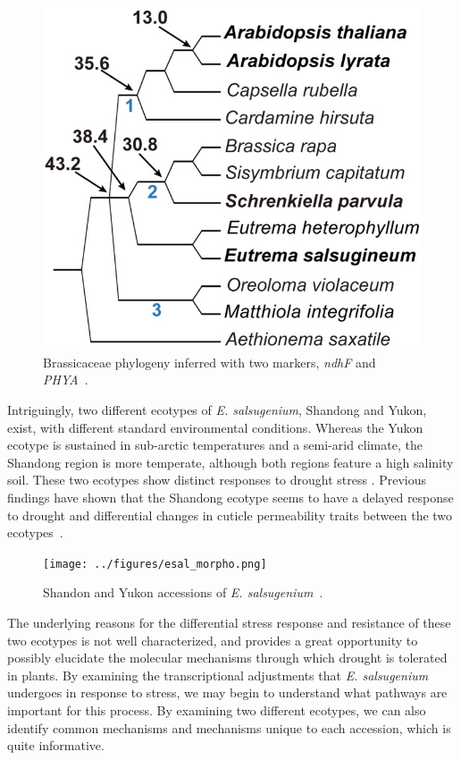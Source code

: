 \documentclass[12pt]{article}
\newcommand{\esal}{\textit{E. salsugenium}}
\begin{document}
		\begin{figure}[H]
			\centering
			\includegraphics[scale=2]{../figures/esal_phylo.jpg}
			\caption[Brassicaceae Phylogeny]{Brassicaceae phylogeny inferred with two markers, \textit{ndhF} and \textit{PHYA}~\cite{yang2013reference}.}
			\label{phylo}
		\end{figure}
		
	Intriguingly, two different ecotypes of \esal{}, Shandong and Yukon, exist, with different standard environmental conditions. Whereas the Yukon ecotype is sustained in sub-arctic temperatures and a semi-arid climate, the Shandong region is more temperate, although both regions feature a high salinity soil. These two ecotypes show distinct responses to drought stress \cite{xu2014leaf}. Previous findings have shown that the Shandong ecotype seems to have a delayed response to drought and differential changes in cuticle permeability traits between the two ecotypes~\cite{macleod2015exposure}. 
	
		\begin{figure}[H]
			\centering
			\texttt{[image: ../figures/esal\_morpho.png]}
			\caption[Shandong and Yukon ecotype morphology]{Shandon and Yukon accessions of \esal{}~\cite{macleod2015exposure}.}
			\label{morpho}
		\end{figure}
		
	The underlying reasons for the differential stress response and resistance of these two ecotypes is not well characterized, and provides a great opportunity to possibly elucidate the molecular mechanisms through which drought is tolerated in plants. By examining the transcriptional adjustments that \esal{} undergoes in response to stress, we may begin to understand what pathways are important for this process. By examining two different ecotypes, we can also identify common mechanisms and mechanisms unique to each accession, which is quite informative. 
	
\end{document}
